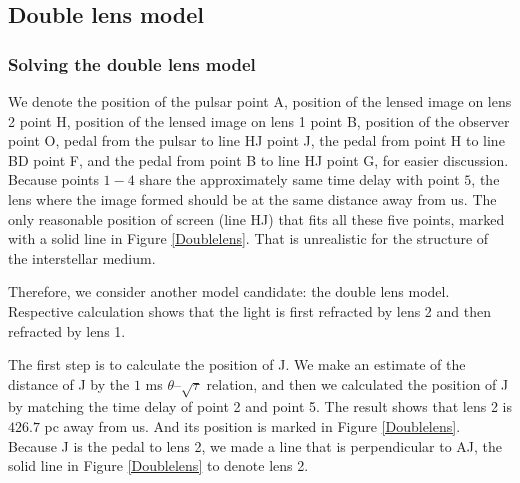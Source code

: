 \documentclass[useAMS,usenatbib]{mn2e}
\begin{document}
\subsection{Double lens model}
\label{doublelensmodel}
\subsubsection{Solving the double lens model}
We denote the position of the pulsar point A, position of the lensed image on lens 2 point H, position of the lensed image on lens 1 point B, position of the observer point O, pedal from the pulsar to line HJ point J, the pedal from point H to line BD point F, and the pedal from point B to line HJ point G, for easier discussion.
Because points $1-4$ share the approximately same time delay with point $5$, the lens where the image formed should be at the same distance away from us. The only reasonable position of screen (line HJ) that fits all these five points, marked with a solid line in Figure \ref{Doublelens}.  
That is unrealistic for the structure of the interstellar medium. 

Therefore, we consider another model candidate: the double lens model. Respective calculation shows that the light is first refracted by lens 2 and then refracted by lens 1. 

The first step is to calculate the position of J. We make an estimate of the distance of J by the $1$ ms $\theta$--$\sqrt{\tau}$ relation, and then we calculated the position of J by matching the time delay of point 2 and point 5. The result shows that lens 2 is $426.7$ pc away from us. And its position is marked in Figure \ref{Doublelens}. Because J is the pedal to lens 2, we made a line that is perpendicular to AJ, the solid line in Figure \ref{Doublelens} to denote lens 2.
\end{document}
